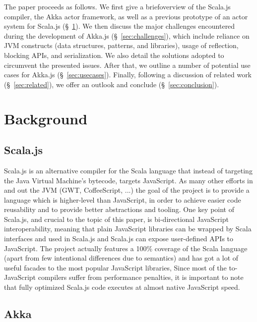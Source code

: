 \documentclass{sig-alternate}
\begin{document}
The paper proceeds as follows. We first give a brief\newline overview of the Scala.js compiler, the Akka actor framework, as well as a previous prototype of an actor system for Scala.js (\S~\ref{sec:background}). We then discuss the major challenges encountered during the development of Akka.js (\S~\ref{sec:challenges}), which include reliance on JVM constructs (data structures, patterns, and libraries), usage of reflection, blocking APIs, and serialization. We also detail the solutions adopted to circumvent the presented issues. After that, we outline a number of potential use cases for Akka.js (\S~\ref{sec:usecases}). Finally, following a discussion of related work (\S~\ref{sec:related}), we offer an outlook and conclude (\S~\ref{sec:conclusion}).

\section{Background}\label{sec:background}

\subsection{Scala.js}

Scala.js is an alternative compiler for the Scala language that instead of targeting the Java Virtual Machine's bytecode, targets JavaScript.
As many other efforts in and out the JVM (GWT, CoffeeScript, ...) the goal of the project is to provide a language which is higher-level than JavaScript, in order to achieve easier code reusability and to provide better abstractions and tooling.
One key point of Scala.js, and crucial to the topic of this paper, is bi-directional JavaScript interoperability, meaning that plain JavaScript libraries can be wrapped by Scala interfaces and used in Scala.js and Scala.js can expose user-defined APIs to JavaScript.
The project actually features a 100\% coverage of the Scala language  (apart from few intentional differences due to semantics) and has got a lot of useful facades to the most popular JavaScript libraries,
Since most of the to-JavaScript compilers suffer from performance penalties, it is important to note that fully optimized Scala.js code executes at almost native JavaScript speed.


\subsection{Akka}\label{sec:akka}
\end{document}
